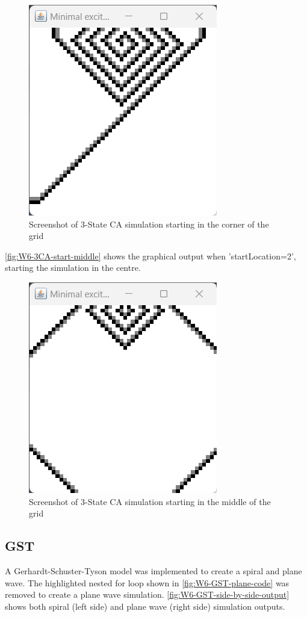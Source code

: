 \begin{figure}[H] 
    \centering
    \includegraphics[width=0.49\columnwidth]{Figures/Week 6/3stateCA-CORNER-output.png}
    \caption{Screenshot of 3-State CA simulation starting in the corner of the grid}
    \label{fig:W6-3CA-start-corner}
\end{figure}

\autoref{fig:W6-3CA-start-middle} shows the graphical output when 'startLocation=2', starting the simulation in the centre. 
\begin{figure}[H] 
    \centering
    \includegraphics[width=0.49\columnwidth]{Figures/Week 6/3stateCA-MIDDLE-output.png}
    \caption{Screenshot of 3-State CA simulation starting in the middle of the grid}
    \label{fig:W6-3CA-start-middle}
\end{figure}

\subsection{GST}
A Gerhardt-Schuster-Tyson model was implemented to create a spiral and plane wave. The highlighted nested for loop shown in \autoref{fig:W6-GST-plane-code} was removed to create a plane wave simulation. \autoref{fig:W6-GST-side-by-side-output} shows both spiral (left side) and plane wave (right side) simulation outputs.

